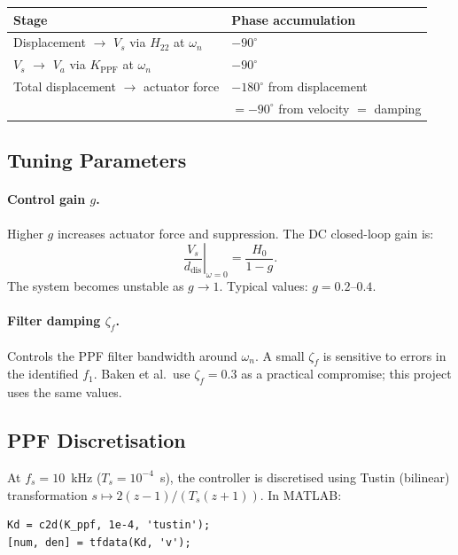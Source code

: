 \documentclass[12pt,a4paper]{article}
\begin{document}
\begin{center}
\begin{tabular}{ll}
\toprule
Stage & Phase accumulation \\
\midrule
Displacement $\to$ $V_s$ via $H_{22}$ at $\omega_n$ & $-90^\circ$ \\
$V_s$ $\to$ $V_a$ via $K_\text{PPF}$ at $\omega_n$  & $-90^\circ$ \\
\midrule
Total displacement $\to$ actuator force  & $-180^\circ$ from displacement \\
\multicolumn{1}{r}{} & $= -90^\circ$ from velocity $= $ damping \\
\bottomrule
\end{tabular}
\end{center}

\subsection{Tuning Parameters}
\label{sec:ppf_tuning}

\paragraph{Control gain $g$.}
Higher $g$ increases actuator force and suppression.  The DC closed-loop gain is:
\begin{equation}
  \left.\frac{V_s}{d_\text{dis}}\right|_{\omega=0} = \frac{H_0}{1 - g}.
\end{equation}
The system becomes unstable as $g \to 1$.  Typical values: $g = 0.2$--$0.4$.

\paragraph{Filter damping $\zeta_f$.}
Controls the PPF filter bandwidth around $\omega_n$.  A small $\zeta_f$ is
sensitive to errors in the identified $f_1$.  Baken et al.\ use $\zeta_f = 0.3$
as a practical compromise; this project uses the same values.

\subsection{PPF Discretisation}
\label{sec:ppf_disc}

At $f_s = 10$~kHz ($T_s = 10^{-4}$~s), the controller is discretised using
Tustin (bilinear) transformation $s \mapsto 2(z-1)/(T_s(z+1))$.  In MATLAB:
\begin{verbatim}
Kd = c2d(K_ppf, 1e-4, 'tustin');
[num, den] = tfdata(Kd, 'v');
\end{verbatim}
\end{document}
